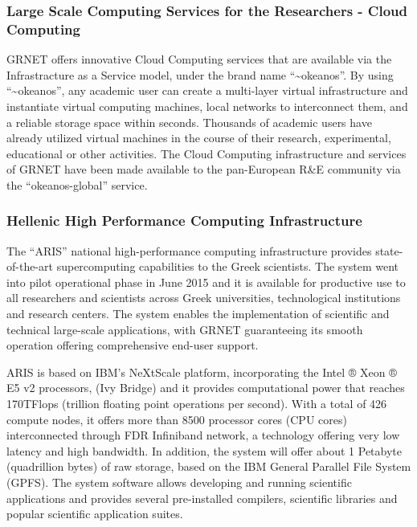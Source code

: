 \subsubsection{Large Scale Computing Services for the Researchers - Cloud Computing}
GRNET offers innovative Cloud Computing services
that are available via the Infrastracture as a Service model,
under the brand name “\textasciitilde okeanos”.
By using “\textasciitilde okeanos”,
any academic user can create a multi-layer virtual infrastructure
and instantiate virtual computing machines,
local networks to interconnect them,
and a reliable storage space within seconds.
Thousands of academic users have already utilized virtual machines
in the course of their research, experimental, educational or other activities.
The Cloud Computing infrastructure and services of GRNET
have been made available to the pan-European R\&E community
via the “okeanos-global” service.

\subsubsection{Hellenic High Performance Computing Infrastructure}
The “ARIS” national high-performance computing infrastructure
provides state-of-the-art supercomputing capabilities
to the Greek scientists.
The system went into pilot operational phase in June 2015
and it is available for productive use
to all researchers and scientists across
Greek universities, technological institutions and research centers.
The system enables the implementation of scientific
and technical large-scale applications,
with GRNET guaranteeing its smooth operation
offering comprehensive end-user support.

ARIS is based on IBM’s NeXtScale platform,
incorporating the Intel ® Xeon ® E5 v2 processors,
(Ivy Bridge) and it provides computational power
that reaches 170TFlops (trillion floating point operations per second).
With a total of 426 compute nodes,
it offers more than 8500 processor cores (CPU cores)
interconnected through FDR Infiniband network,
a technology offering very low latency and high bandwidth.
In addition, the system will offer about
1 Petabyte (quadrillion bytes) of raw storage,
based on the IBM General Parallel File System (GPFS).
The system software allows developing
and running scientific applications
and provides several pre-installed compilers,
scientific libraries and popular scientific application suites.

